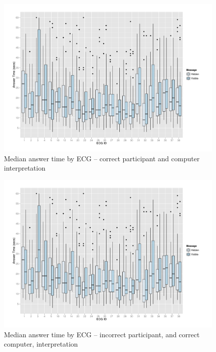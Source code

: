 \begin{figure}[htbp]
\centerline{\includegraphics[page=1,keepaspectratio=false,width=0.8\paperwidth,height=0.45\paperwidth]{AnsTimeVsECG.pdf}}
\caption{Median answer time by ECG -- correct participant and computer interpretation}
\label{boxplot1}
\end{figure}

\begin{figure}[htbp]
\centerline{\includegraphics[page=2,keepaspectratio=false,width=0.8\paperwidth,height=0.45\paperwidth]{AnsTimeVsECG.pdf}}
\caption{Median answer time by ECG -- incorrect participant, and correct computer, interpretation}
\label{boxplot2}
\end{figure}

